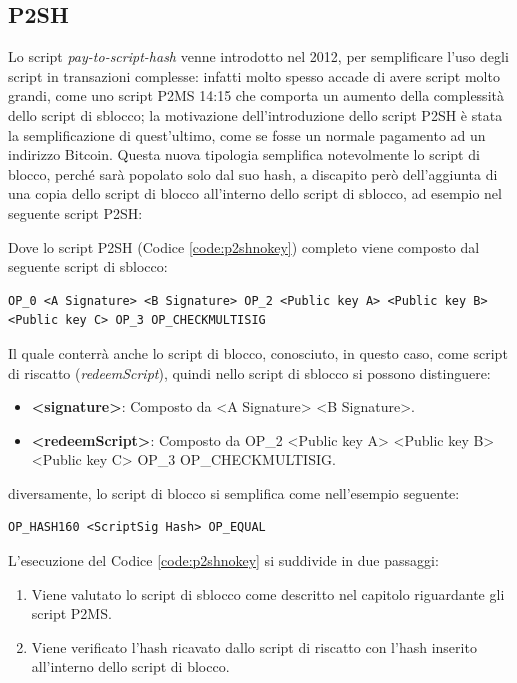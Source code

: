 \subsection{P2SH}
Lo script {\it pay-to-script-hash \/} venne introdotto nel 2012, per semplificare l’uso degli script in transazioni complesse: infatti molto spesso accade di avere script molto grandi, come uno script P2MS 14:15 che comporta un aumento della complessità dello script di sblocco; la motivazione dell’introduzione dello script P2SH è stata la semplificazione di quest’ultimo, come se fosse un normale pagamento ad un indirizzo Bitcoin.
Questa nuova tipologia semplifica notevolmente lo script di blocco, perché sarà popolato solo dal suo hash, a discapito però dell’aggiunta di una copia dello script di blocco all’interno dello script di sblocco, ad esempio nel seguente script P2SH:



Dove lo script P2SH (Codice \ref{code:p2shnokey}) completo viene composto dal seguente script di sblocco:
\begin{lstlisting}[language=bitcoinscript, label={code:p2shunlock}, caption={Script P2SH di sblocco.}]
OP_0 <A Signature> <B Signature> OP_2 <Public key A> <Public key B>
<Public key C> OP_3 OP_CHECKMULTISIG
\end{lstlisting}

Il quale conterrà anche lo script di blocco, conosciuto, in questo caso, come script di riscatto ({\it redeemScript\/}), quindi nello script di sblocco si possono distinguere:
\begin{itemize}
  \item {\bf <signature>\/}: Composto da <A Signature> <B Signature>.
  \item {\bf <redeemScript>\/}: Composto da OP\_2 <Public key A> <Public key B> <Public key C> OP\_3 OP\_CHECKMULTISIG.
\end{itemize}

diversamente, lo script di blocco si semplifica come nell’esempio seguente:
\begin{lstlisting}[language=bitcoinscript, label={code:p2shlock}, caption={Script P2SH di blocco.}]
OP_HASH160 <ScriptSig Hash> OP_EQUAL
\end{lstlisting}

L’esecuzione del Codice \ref{code:p2shnokey} si suddivide in due passaggi:

\begin{enumerate}
  \item Viene valutato lo script di sblocco come descritto nel capitolo riguardante gli script P2MS.
  \item Viene verificato l'hash ricavato dallo script di riscatto con l’hash inserito all’interno dello script di blocco.
\end{enumerate}

